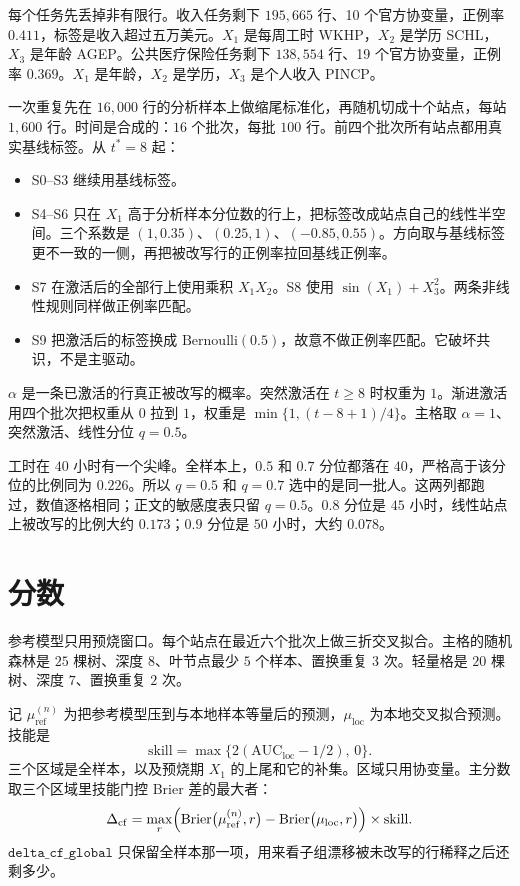 \documentclass[11pt,a4paper,fontset=none]{ctexart}
\newcommand{\Dcf}{\ensuremath{\Delta_{\mathrm{cf}}}}
\begin{document}
每个任务先丢掉非有限行。收入任务剩下 \(195{,}665\) 行、10 个官方协变量，正例率 \(0.411\)，标签是收入超过五万美元。\(X_1\) 是每周工时 WKHP，\(X_2\) 是学历 SCHL，\(X_3\) 是年龄 AGEP。公共医疗保险任务剩下 \(138{,}554\) 行、19 个官方协变量，正例率 \(0.369\)。\(X_1\) 是年龄，\(X_2\) 是学历，\(X_3\) 是个人收入 PINCP。

一次重复先在 \(16{,}000\) 行的分析样本上做缩尾标准化，再随机切成十个站点，每站 \(1{,}600\) 行。时间是合成的：\(16\) 个批次，每批 \(100\) 行。前四个批次所有站点都用真实基线标签。从 \(t^{\ast}=8\) 起：

\begin{itemize}
\item S0--S3 继续用基线标签。
\item S4--S6 只在 \(X_1\) 高于分析样本分位数的行上，把标签改成站点自己的线性半空间。三个系数是 \((1,0.35)\)、\((0.25,1)\)、\((-0.85,0.55)\)。方向取与基线标签更不一致的一侧，再把被改写行的正例率拉回基线正例率。
\item S7 在激活后的全部行上使用乘积 \(X_1 X_2\)。S8 使用 \(\sin(X_1)+X_3^{2}\)。两条非线性规则同样做正例率匹配。
\item S9 把激活后的标签换成 \(\mathrm{Bernoulli}(0.5)\)，故意不做正例率匹配。它破坏共识，不是主驱动。
\end{itemize}

\(\alpha\) 是一条已激活的行真正被改写的概率。突然激活在 \(t\ge 8\) 时权重为 \(1\)。渐进激活用四个批次把权重从 \(0\) 拉到 \(1\)，权重是 \(\min\{1,(t-8+1)/4\}\)。主格取 \(\alpha=1\)、突然激活、线性分位 \(q=0.5\)。

工时在 \(40\) 小时有一个尖峰。全样本上，\(0.5\) 和 \(0.7\) 分位都落在 \(40\)，严格高于该分位的比例同为 \(0.226\)。所以 \(q=0.5\) 和 \(q=0.7\) 选中的是同一批人。这两列都跑过，数值逐格相同；正文的敏感度表只留 \(q=0.5\)。\(0.8\) 分位是 \(45\) 小时，线性站点上被改写的比例大约 \(0.173\)；\(0.9\) 分位是 \(50\) 小时，大约 \(0.078\)。

\section{分数}

参考模型只用预烧窗口。每个站点在最近六个批次上做三折交叉拟合。主格的随机森林是 \(25\) 棵树、深度 \(8\)、叶节点最少 \(5\) 个样本、置换重复 \(3\) 次。轻量格是 \(20\) 棵树、深度 \(7\)、置换重复 \(2\) 次。

记 \(\mu_{\mathrm{ref}}^{(n)}\) 为把参考模型压到与本地样本等量后的预测，\(\mu_{\mathrm{loc}}\) 为本地交叉拟合预测。技能是
\[
\mathrm{skill}=\max\bigl\{2(\mathrm{AUC}_{\mathrm{loc}}-1/2),\,0\bigr\}.
\]
三个区域是全样本，以及预烧期 \(X_1\) 的上尾和它的补集。区域只用协变量。主分数取三个区域里技能门控 Brier 差的最大者：
\[
\Dcf
=
\max_{r}
\Bigl(
\mathrm{Brier}\bigl(\mu_{\mathrm{ref}}^{(n)},r\bigr)
-
\mathrm{Brier}\bigl(\mu_{\mathrm{loc}},r\bigr)
\Bigr)
\times
\mathrm{skill}.
\]
\(\texttt{delta\_cf\_global}\) 只保留全样本那一项，用来看子组漂移被未改写的行稀释之后还剩多少。
\end{document}
